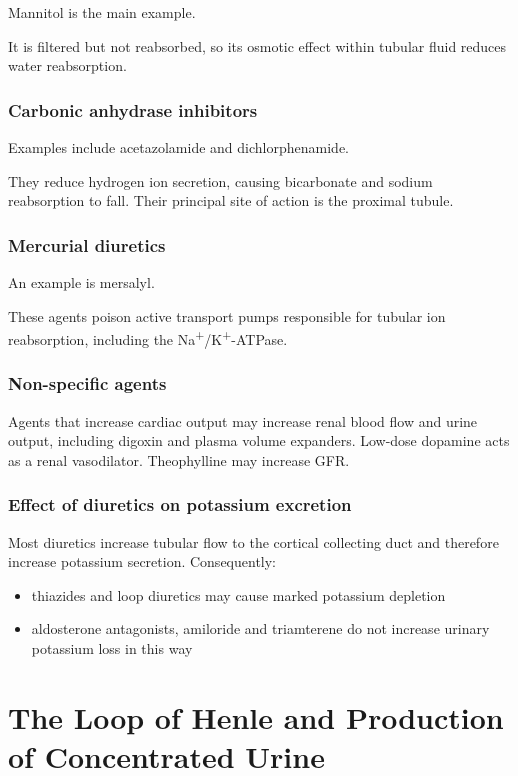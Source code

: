 \documentclass[11pt,a4paper]{article}
\begin{document}
Mannitol is the main example.

It is filtered but not reabsorbed, so its osmotic effect within tubular fluid reduces water reabsorption.

\subsubsection{Carbonic anhydrase inhibitors}

Examples include acetazolamide and dichlorphenamide.

They reduce hydrogen ion secretion, causing bicarbonate and sodium reabsorption to fall. Their principal site of action is the proximal tubule.

\subsubsection{Mercurial diuretics}

An example is mersalyl.

These agents poison active transport pumps responsible for tubular ion reabsorption, including the Na\textsuperscript{+}/K\textsuperscript{+}-ATPase.

\subsubsection{Non-specific agents}

Agents that increase cardiac output may increase renal blood flow and urine output, including digoxin and plasma volume expanders. Low-dose dopamine acts as a renal vasodilator. Theophylline may increase GFR.

\subsubsection{Effect of diuretics on potassium excretion}

Most diuretics increase tubular flow to the cortical collecting duct and therefore increase potassium secretion. Consequently:
\begin{itemize}
    \item thiazides and loop diuretics may cause marked potassium depletion
    \item aldosterone antagonists, amiloride and triamterene do not increase urinary potassium loss in this way
\end{itemize}

\section{The Loop of Henle and Production of Concentrated Urine}
\end{document}
